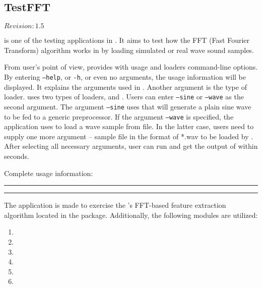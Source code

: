 \subsection{TestFFT}

$Revision: 1.5 $

 is one of the testing applications in {\marf}.
It aims to test how the FFT (Fast Fourier Transform) algorithm works in
 by loading simulated or real wave sound samples.

From user's point of view,  provides with usage and loaders
command-line options. By entering \texttt{--help}, or \texttt{-h}, or
even no arguments, the usage information will be displayed. It explains
the arguments used in . Another argument is the type of
loader.  uses two types of loaders,  and .
Users can enter \texttt{--sine} or \texttt{--wave} as the second argument.
The argument \texttt{--sine} uses  that will generate a
plain sine wave to be fed to a generic preprocessor.
If the argument \texttt{--wave} is specified, the application uses 
to load a wave sample from file. In the latter case, users need to supply
one more argument -- sample file in the format of *.wav to be loaded by .
After selecting all necessary arguments, user can run and get the output of  within seconds.

\noindent
Complete usage information:

\vspace{15pt}
\hrule

\hrule
\vspace{15pt}


The application is made to exercise the {\marf}'s
FFT-based feature extraction algorithm located in the  package.
Additionally, the following {\marf} modules are utilized:

\begin{enumerate}
\item
{}

\item
{}

\item
{}

\item
{}

\item
{}

\item
{}
\end{enumerate}

